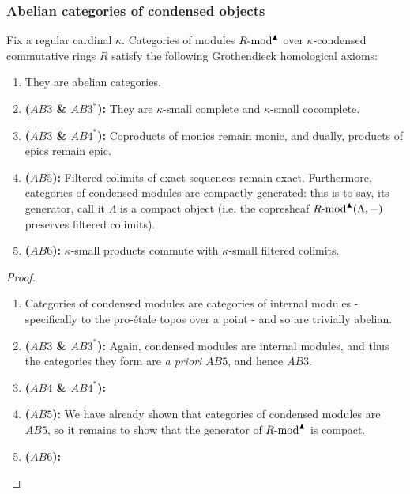         \subsubsection{Abelian categories of condensed objects}
            \begin{theorem} \label{theorem: abelian_categories_of_condensed_modules}
                Fix a regular cardinal $\kappa$. Categories of modules $R\text{-}\mathrm{mod}^{\blacktriangle}$ over $\kappa$-condensed commutative rings $R$ satisfy the following Grothendieck homological axioms:
                    \begin{enumerate}
                        \item They are abelian categories.
                        \item \textbf{($AB3$ \& $AB3^*$):} They are $\kappa$-small complete and $\kappa$-small cocomplete.
                        \item \textbf{($AB3$ \& $AB4^*$):} Coproducts of monics remain monic, and dually, products of epics remain epic.
                        \item \textbf{($AB5$):} Filtered colimits of exact sequences remain exact. Furthermore, categories of condensed modules are compactly generated: this is to say, its generator, call it $\Lambda$ is a compact object (i.e. the copresheaf $R\text{-}\mathrm{mod}^{\blacktriangle}(\Lambda, -)$ preserves filtered colimits).
                        \item \textbf{($AB6$):} $\kappa$-small products commute with $\kappa$-small filtered colimits.
                    \end{enumerate}
            \end{theorem}
                \begin{proof}
                    \noindent
                    \begin{enumerate}
                        \item Categories of condensed modules are categories of internal modules - specifically to the pro-\'etale topos over a point - and so are trivially abelian. 
                        \item \textbf{($AB3$ \& $AB3^*$):} Again, condensed modules are internal modules, and thus the categories they form are \textit{a priori} $AB5$, and hence $AB3$.
                        \item \textbf{($AB4$ \& $AB4^*$):} 
                        \item \textbf{($AB5$):} We have already shown that categories of condensed modules are $AB5$, so it remains to show that the generator of $R\text{-}\mathrm{mod}^{\blacktriangle}$ is compact.
                        \item \textbf{($AB6$):} 
                    \end{enumerate}
                \end{proof}

